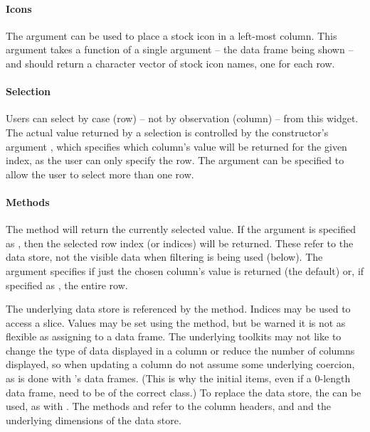 \paragraph{Icons}
The  argument can be used to place a stock
icon in a left-most column.  This argument takes a function of a
single argument -- the data frame being shown -- and should return a
character vector of stock icon names, one for each row.

\paragraph{Selection}
Users can select by case (row) -- not by observation (column) -- from
this widget. The actual value returned by a selection is controlled by
the constructor's argument , which
specifies which column's value will be returned for the given index,
as the user can only specify the row. The 
argument can be specified to allow the user to select more than one
row.

\paragraph{Methods}
The  method will return the currently selected
value. If the argument  is specified as , then
the selected row index (or indices) will be returned. These refer to
the data store, not the visible data when filtering is being used (below). The
argument  specifies if just the chosen column's value is
returned (the default) or, if specified as , the entire row.
 
The underlying data store is referenced by the \method{[}{gtable}
method. Indices may be used to access a slice. Values may be set using
the \method{[\ASSIGN}{gtable} method, but be warned it is not as
flexible as assigning to a data frame. The underlying toolkits may not
like to change the type of data displayed in a column or reduce the
number of columns displayed, so when updating a column do not assume
some underlying coercion, as is done with \R's data frames. (This is
why the initial items, even if a $0$-length data frame, need to be of
the correct class.) To replace the data store, the \code{[\ASSIGN} can
be used, as with . The methods
 and  refer to the
column headers, and  and 
the underlying dimensions of the data store.

